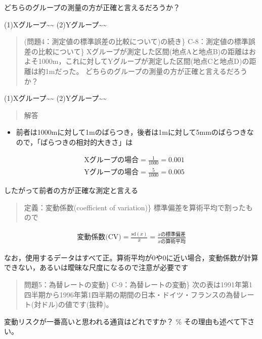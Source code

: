 \documentclass[
]{book}
\providecommand{\tightlist}{%
  \setlength{\itemsep}{0pt}\setlength{\parskip}{0pt}}
\theoremstyle{definition}
\theoremstyle{definition}
\theoremstyle{definition}
\theoremstyle{definition}
\theoremstyle{remark}
\begin{document}
どちらのグループの測量の方が正確と言えるだろうか？

(1)Xグループ\textasciitilde\textasciitilde{}
(2)Yグループ\textasciitilde\textasciitilde{}

\begin{quote}
(問題4：測定値の標準誤差の比較について)の続き\}
C-8：測定値の標準誤差の比較について\}
Xグループが測定した区間(地点Aと地点B)の距離はおよそ1000m，これに対してYグループが測定した区間(地点Cと地点D)の距離は約1mだった。
どちらのグループの測量の方が正確と言えるだろうか？
\end{quote}

(1)Xグループ\textasciitilde\textasciitilde{}
(2)Yグループ\textasciitilde\textasciitilde{}

\begin{quote}
解答
\end{quote}

\begin{itemize}
\tightlist
\item
  前者は1000mに対して1mのばらつき，後者は1mに対して5mmのばらつきなので，「ばらつきの相対的大きさ」は
\end{itemize}

\begin{align*}
&\text{Xグループの場合}=\frac{1}{1000}=0.001 \\
&\text{Yグループの場合}=\frac{5}{1000}=0.005
\end{align*}

したがって前者の方が正確な測定と言える

\begin{quote}
定義：変動係数(coefficient of variation)\}
標準偏差を算術平均で割ったもので
\end{quote}

\begin{align*}
\text{変動係数(CV)}=\frac{\text{sd}(x)}{\bar{x}}=\frac{x\text{の標準偏差}}{x\text{の算術平均}}
\end{align*}

なお，使用するデータはすべて正。算術平均が0や0に近い場合，変動係数が計算できない，あるいは曖昧な尺度になるので注意が必要です

\begin{quote}
問題5：為替レートの変動\}
C-9：為替レートの変動\}
次の表は1991年第1四半期から1996年第1四半期の期間の日本・ドイツ・フランスの為替レート(対ドル)の値です(抜粋)。
\end{quote}

変動リスクが一番高いと思われる通貨はどれですか？ \% その理由も述べて下さい。
\end{document}

